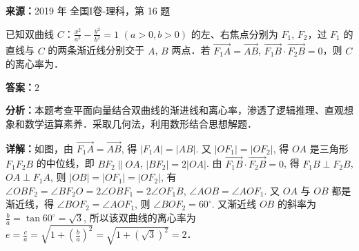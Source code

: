\begin{question}[points=5]
\textbf{来源：}2019 年 全国I卷-理科，第 16 题\par
已知双曲线 $C$：$\frac{x^2}{a^2} - \frac{y^2}{b^2} = 1$ $(a > 0, b > 0)$ 的左、右焦点分别为 $F_1$, $F_2$，过 $F_1$ 的直线与 $C$ 的两条渐近线分别交于 $A$, $B$ 两点．若 $\overrightarrow{F_1A} = \overrightarrow{AB}$, $\overrightarrow{F_1B} \cdot \overrightarrow{F_2B} = 0$，则 $C$ 的离心率为．
\fillin[{$2$}]
\begin{solution}
\textbf{答案：}$2$

\textbf{分析：}本题考查平面向量结合双曲线的渐进线和离心率，渗透了逻辑推理、直观想象和数学运算素养．采取几何法，利用数形结合思想解题．

\textbf{详解：}如图，由 $\overrightarrow{F_1A} = \overrightarrow{AB}$, 得 $|F_1A| = |AB|$. 又 $|OF_1| = |OF_2|$, 得 $OA$ 是三角形 $F_1F_2B$ 的中位线，即 $BF_2 \parallel OA$, $|BF_2| = 2|OA|$. 由 $\overrightarrow{F_1B} \cdot \overrightarrow{F_2B} = 0$, 得 $F_1B \perp F_2B$, $OA \perp F_1A$, 则 $|OB| = |OF_1| = |OF_2|$, 有 $\angle OBF_2 = \angle BF_2O = 2\angle OBF_1 = 2\angle OF_1B$, $\angle AOB = \angle AOF_1$. 又 $OA$ 与 $OB$ 都是渐近线，得 $\angle BOF_2 = \angle AOF_1$, 则 $\angle BOF_2 = 60^\circ$. 又渐近线 $OB$ 的斜率为 $\frac{b}{a} = \tan 60^\circ = \sqrt{3}$, 所以该双曲线的离心率为 $e = \frac{c}{a} = \sqrt{1 + \left(\frac{b}{a}\right)^2} = \sqrt{1 + (\sqrt{3})^2} = 2$．
\end{solution}
\end{question}

